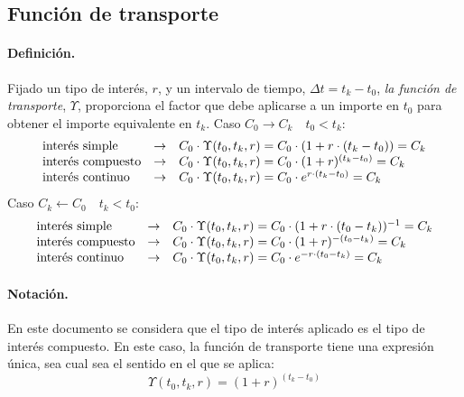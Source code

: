 \subsection{Funci\'on de transporte}

\paragraph{Definici\'on.} Fijado un tipo de inter\'es, $r$, y un intervalo de
tiempo, $\Delta t = t_k-t_0$, \emph{la funci\'on de transporte},
$\Upsilon$, proporciona el factor que debe aplicarse a un importe en $t_0$ para obtener el
importe equivalente en $t_k$.
\newline
\newline
Caso $C_0 \longrightarrow C_k \quad t_0 < t_k$:
\begin{displaymath}
\begin{array}{lcl}
\textrm{inter\'es simple}    & \rightarrow & C_0 \cdot \Upsilon(t_0,t_k, r) = C_0 \cdot (1+r\cdot(t_k-t_0)) = C_k \cr
\textrm{inter\'es compuesto} & \rightarrow & C_0 \cdot \Upsilon(t_0,t_k, r) = C_0 \cdot (1+r)^{(t_k-t_0)} = C_k \cr
\textrm{inter\'es continuo}  & \rightarrow & C_0 \cdot \Upsilon(t_0,t_k, r) = C_0 \cdot e^{r\cdot(t_k-t_0)} = C_k 
\end{array}
\end{displaymath}
Caso $C_k \longleftarrow C_0 \quad t_k < t_0$:
\begin{displaymath}
\begin{array}{lcl}
\textrm{inter\'es simple}    & \rightarrow & C_0 \cdot \Upsilon(t_0,t_k, r) = C_0 \cdot (1+r\cdot(t_0-t_k))^{-1} = C_k \cr
\textrm{inter\'es compuesto} & \rightarrow & C_0 \cdot \Upsilon(t_0,t_k, r) = C_0 \cdot (1+r)^{-(t_0-t_k)} = C_k \cr
\textrm{inter\'es continuo}  & \rightarrow & C_0 \cdot \Upsilon(t_0,t_k, r) = C_0 \cdot e^{-r\cdot(t_0-t_k)} = C_k
\end{array}
\end{displaymath}

\paragraph{Notaci\'on.} En este documento se considera que el tipo de inter\'es
aplicado es el tipo de inter\'es compuesto. En este caso, la funci\'on de transporte
tiene una expresi\'on \'unica, sea cual sea el sentido en el que se aplica:
\begin{equation}
\label{funcion_transporte_1}
\Upsilon(t_0,t_k, r) = (1+r)^{(t_k-t_0)}
\end{equation}


